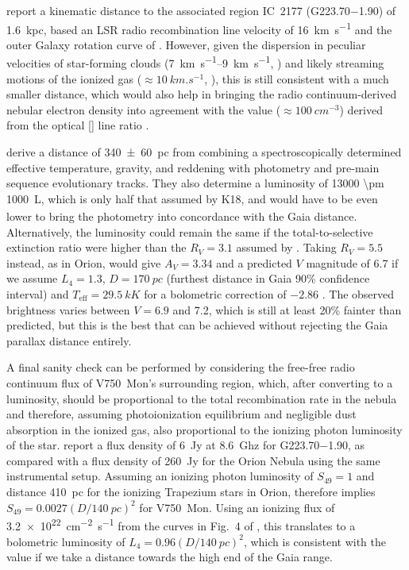 \citet{Quireza:2006b} report a kinematic distance to the associated
\hii{} region IC~2177 (G\num{223.70}\num{-1.90}) of \SI{1.6}{kpc},
based an LSR radio recombination line velocity of \SI{+16}{km.s^{-1}}
\citep{Quireza:2006a} and the outer Galaxy rotation curve of
\citet{Brand:1993a}.  However, given the dispersion in peculiar
velocities of star-forming clouds (\SIrange{7}{9}{km.s^{-1}},
\citealp{Stark:1984a}) and likely streaming motions of the ionized gas
(\(\approx \SI{10}{km.s^{-1}}\), \citealp{Matzner:2002a, Lee:2012a}),
this is still consistent with a much smaller distance, which would
also help in bringing the radio continuum-derived nebular electron
density into agreement with the value (\(\approx \SI{100}{cm^{-3}}\))
derived from the optical [] line ratio
\citep{Hawley:1978a}.

\citet{Fairlamb:2015a} derive a distance of \SI{340 \pm 60}{pc} from
combining a spectroscopically determined effective temperature,
gravity, and reddening with photometry and pre-main sequence
evolutionary tracks.  They also determine a luminosity of \SI{13000
  \pm 1000}{L_\odot}, which is only half that assumed by K18, and
would have to be even lower to bring the photometry into concordance
with the Gaia distance.  Alternatively, the luminosity could remain
the same if the total-to-selective extinction ratio were higher than
the \(R_V = 3.1\) assumed by \citet{Fairlamb:2015a}.  Taking
\(R_V = 5.5\) instead, as in Orion, would give \(A_V = 3.34\) and a
predicted \(V\) magnitude of 6.7 if we assume \(L_4 = 1.3\),
\(D = \SI{170}{pc}\) (furthest distance in Gaia 90\% confidence
interval) and \(T_{\text{eff}} = \SI{29.5}{kK}\)
\citep{Fairlamb:2015a} for a bolometric correction of \(-2.86\)
\citep{Nieva:2013a}.  The observed brightness varies between
\(V = 6.9\) and 7.2, which is still at least 20\% fainter than
predicted, but this is the best that can be achieved without rejecting
the Gaia parallax distance entirely.

A final sanity check can be performed by considering the free-free
radio continuum flux of V750~Mon's surrounding \hii{} region, which,
after converting to a luminosity, should be proportional to the total
recombination rate in the nebula and therefore, assuming
photoionization equilibrium and negligible dust absorption in the
ionized gas, also proportional to the ionizing photon luminosity of
the star.  \citet{Quireza:2006b} report a flux density of \SI{6}{Jy}
at \SI{8.6}{Ghz} for G\num{223.70}\num{-1.90}, as compared with a flux
density of \SI{260}{Jy} for the Orion Nebula using the same
instrumental setup.  Assuming an ionizing photon luminosity of
\(S_{49} = 1\) and distance \SI{410}{pc} for the ionizing Trapezium
stars in Orion, therefore implies
\(S_{49} = 0.0027 (D/\SI{140}{pc})^2\) for V750~Mon.  Using an
ionizing flux of \SI{3.2e22}{cm^{-2}.s^{-1}} from the curves in Fig.~4
of \citet{Sternberg:2003a}, this translates to a bolometric luminosity
of \(L_4 = 0.96 (D/\SI{140}{pc})^2\), which is consistent with the
\citet{Fairlamb:2015a} value if we take a distance towards the high
end of the Gaia range.

